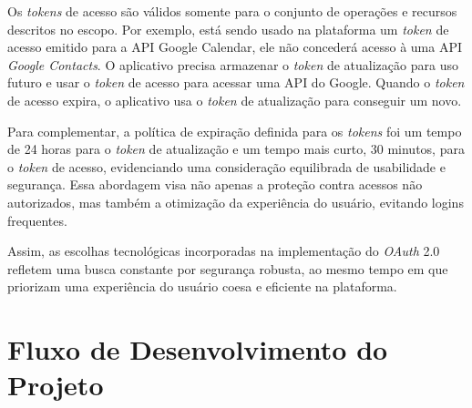 Os \textit{tokens} de acesso são válidos somente para o conjunto de operações e recursos descritos no escopo. Por exemplo, está sendo usado na plataforma um \textit{token} de acesso emitido para a API Google Calendar, ele não concederá acesso à uma API \textit{Google Contacts}. O aplicativo precisa armazenar o \textit{token} de atualização para uso futuro e usar o \textit{token} de acesso para acessar uma API do Google. Quando o \textit{token} de acesso expira, o aplicativo usa o \textit{token} de atualização para conseguir um novo.

Para complementar, a política de expiração definida para os \textit{tokens} foi um tempo de 24 horas para o \textit{token} de atualização e um tempo mais curto, 30 minutos, para o \textit{token} de acesso, evidenciando uma consideração equilibrada de usabilidade e segurança. Essa abordagem visa não apenas a proteção contra acessos não autorizados, mas também a otimização da experiência do usuário, evitando logins frequentes.

Assim, as escolhas tecnológicas incorporadas na implementação do \textit{OAuth} 2.0 refletem uma busca constante por segurança robusta, ao mesmo tempo em que priorizam uma experiência do usuário coesa e eficiente na plataforma.

\section{Fluxo de Desenvolvimento do Projeto}

